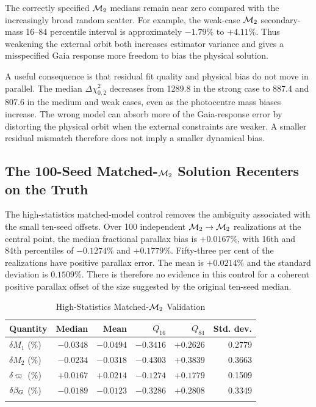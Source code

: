 The correctly specified $\mathcal{M}_2$ medians remain near zero compared with the increasingly broad random scatter. For example, the weak-case $\mathcal{M}_2$ secondary-mass 16--84 percentile interval is approximately $-1.79\%$ to $+4.11\%$. Thus weakening the external orbit both increases estimator variance and gives a misspecified Gaia response more freedom to bias the physical solution.

A useful consequence is that residual fit quality and physical bias do not move in parallel. The median $\Delta\chi^2_{0,2}$ decreases from 1289.8 in the strong case to 887.4 and 807.6 in the medium and weak cases, even as the photocentre mass biases increase. The wrong model can absorb more of the Gaia-response error by distorting the physical orbit when the external constraints are weaker. A smaller residual mismatch therefore does not imply a smaller dynamical bias.

\subsection{The 100-Seed Matched-$\mathcal{M}_2$ Solution Recenters on the Truth}

The high-statistics matched-model control removes the ambiguity associated with the small ten-seed offsets. Over 100 independent $\mathcal{M}_2\rightarrow\mathcal{M}_2$ realizations at the central point, the median fractional parallax bias is $+0.0167\%$, with 16th and 84th percentiles of $-0.1274\%$ and $+0.1779\%$. Fifty-three per cent of the realizations have positive parallax error. The mean is $+0.0214\%$ and the standard deviation is $0.1509\%$. There is therefore no evidence in this control for a coherent positive parallax offset of the size suggested by the original ten-seed median.

\begin{table}
\begin{center}
\caption{High-Statistics Matched-$\mathcal{M}_2$ Validation}
\label{tab:m2control}
\begin{tabular}{lrrrrr}
\hline\noalign{\smallskip}
Quantity & Median & Mean & $Q_{16}$ & $Q_{84}$ & Std. dev.\\
\hline\noalign{\smallskip}
$\delta M_1$ (\%) & $-0.0348$ & $-0.0494$ & $-0.3416$ & $+0.2626$ & 0.2779\\
$\delta M_2$ (\%) & $-0.0234$ & $-0.0318$ & $-0.4303$ & $+0.3839$ & 0.3663\\
$\delta\varpi$ (\%) & $+0.0167$ & $+0.0214$ & $-0.1274$ & $+0.1779$ & 0.1509\\
$\delta\beta_G$ (\%) & $-0.0189$ & $-0.0123$ & $-0.3286$ & $+0.2808$ & 0.3349\\
\noalign{\smallskip}\hline
\end{tabular}
\end{center}
\end{table}

